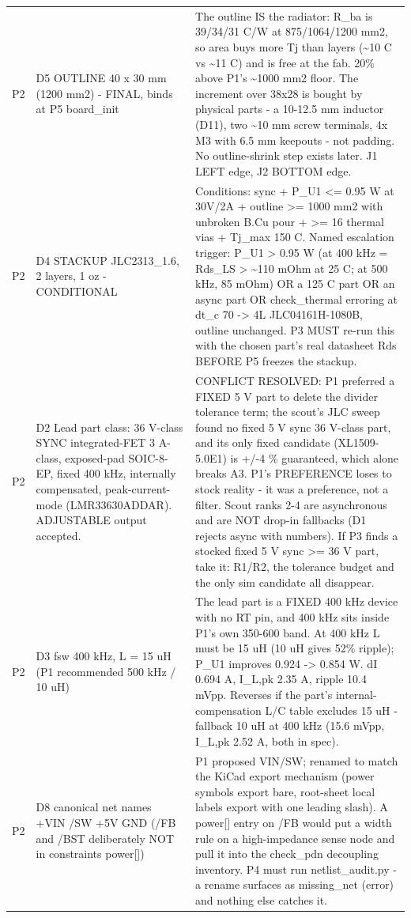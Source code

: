\documentclass[11pt,a4paper]{article}
\begin{document}
{\begin{longtable}{lp{5.2cm}p{7.2cm}}
P2 & D5 OUTLINE 40 x 30 mm (1200 mm2) - FINAL, binds at P5 board\_init & The outline IS the radiator: R\_ba is 39/34/31 C/W at 875/1064/1200 mm2, so area buys more Tj than layers (\textasciitilde{}10 C vs \textasciitilde{}11 C) and is free at the fab. 20\% above P1's \textasciitilde{}1000 mm2 floor. The increment over 38x28 is bought by physical parts - a 10-12.5 mm inductor (D11), two \textasciitilde{}10 mm screw terminals, 4x M3 with 6.5 mm keepouts - not padding. No outline-shrink step exists later. J1 LEFT edge, J2 BOTTOM edge. \\
P2 & D4 STACKUP JLC2313\_1.6, 2 layers, 1 oz - CONDITIONAL & Conditions: sync + P\_U1 \textless{}= 0.95 W at 30V/2A + outline \textgreater{}= 1000 mm2 with unbroken B.Cu pour + \textgreater{}= 16 thermal vias + Tj\_max 150 C. Named escalation trigger: P\_U1 \textgreater{} 0.95 W (at 400 kHz = Rds\_LS \textgreater{} \textasciitilde{}110 mOhm at 25 C; at 500 kHz, 85 mOhm) OR a 125 C part OR an async part OR check\_thermal erroring at dt\_c 70 -\textgreater{} 4L JLC04161H-1080B, outline unchanged. P3 MUST re-run this with the chosen part's real datasheet Rds BEFORE P5 freezes the stackup. \\
P2 & D2 Lead part class: 36 V-class SYNC integrated-FET 3 A-class, exposed-pad SOIC-8-EP, fixed 400 kHz, internally compensated, peak-current-mode (LMR33630ADDAR). ADJUSTABLE output accepted. & CONFLICT RESOLVED: P1 preferred a FIXED 5 V part to delete the divider tolerance term; the scout's JLC sweep found no fixed 5 V sync 36 V-class part, and its only fixed candidate (XL1509-5.0E1) is +/-4 \% guaranteed, which alone breaks A3. P1's PREFERENCE loses to stock reality - it was a preference, not a filter. Scout ranks 2-4 are asynchronous and are NOT drop-in fallbacks (D1 rejects async with numbers). If P3 finds a stocked fixed 5 V sync \textgreater{}= 36 V part, take it: R1/R2, the tolerance budget and the only sim candidate all disappear. \\
P2 & D3 fsw 400 kHz, L = 15 uH (P1 recommended 500 kHz / 10 uH) & The lead part is a FIXED 400 kHz device with no RT pin, and 400 kHz sits inside P1's own 350-600 band. At 400 kHz L must be 15 uH (10 uH gives 52\% ripple); P\_U1 improves 0.924 -\textgreater{} 0.854 W. dI 0.694 A, I\_L,pk 2.35 A, ripple 10.4 mVpp. Reverses if the part's internal-compensation L/C table excludes 15 uH - fallback 10 uH at 400 kHz (15.6 mVpp, I\_L,pk 2.52 A, both in spec). \\
P2 & D8 canonical net names +VIN /SW +5V GND (/FB and /BST deliberately NOT in constraints power{[}{]}) & P1 proposed VIN/SW; renamed to match the KiCad export mechanism (power symbols export bare, root-sheet local labels export with one leading slash). A power{[}{]} entry on /FB would put a width rule on a high-impedance sense node and pull it into the check\_pdn decoupling inventory. P4 must run netlist\_audit.py - a rename surfaces as missing\_net (error) and nothing else catches it. \\

\end{longtable}}
\end{document}

